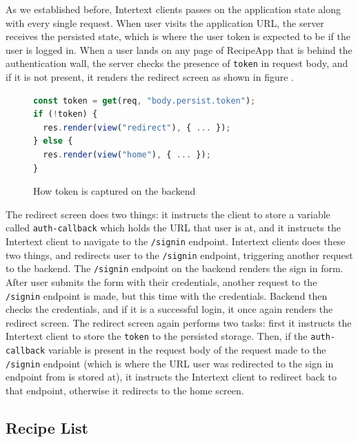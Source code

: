 As we established before, Intertext clients passes on the application state along with every single request. When user visits the application URL, the server receives the persisted state, which is where the user token is expected to be if the user is logged in. When a user lands on any page of RecipeApp that is behind the authentication wall, the server checks the presence of \texttt{token} in request body, and if it is not present, it renders the redirect screen as shown in figure . 

\begin{figure}[htb]
\begin{minipage}{\linewidth}
\begin{lstlisting}[language=javascript]
const token = get(req, "body.persist.token");
if (!token) {
  res.render(view("redirect"), { ... });
} else {
  res.render(view("home"), { ... });
}
\end{lstlisting}
\end{minipage}
\caption{How token is captured on the backend}%
\label{fig:token_capture}%
\end{figure}

The redirect screen does two things: it instructs the client to store a variable called \texttt{auth-callback} which holds the URL that user is at, and it instructs the Intertext client to navigate to the \texttt{/signin} endpoint. Intertext clients does these two things, and redirects user to the \texttt{/signin} endpoint, triggering another request to the backend. The \texttt{/signin} endpoint on the backend renders the sign in form. After user submits the form with their credentials, another request to the \texttt{/signin} endpoint is made, but this time with the credentials. Backend then checks the credentials, and if it is a successful login, it once again renders the redirect screen. The redirect screen again performs two tasks: first it instructs the Intertext client to store the \texttt{token} to the persisted storage. Then, if the \texttt{auth-callback} variable is present in the request body of the request made to the \texttt{/signin} endpoint (which is where the URL user was redirected to the sign in endpoint from is stored at), it instructs the Intertext client to redirect back to that endpoint, otherwise it redirects to the home screen.

\subsection{Recipe List}


